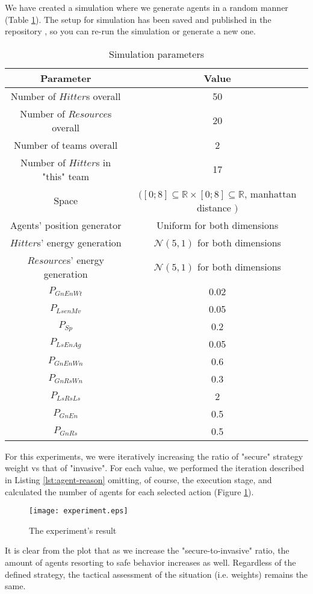 We have created a simulation where we generate agents in a random manner (Table \ref{tab:sim-parameters}). The setup for
simulation has been saved and published in the repository \cite{github}, so you can re-run the simulation or generate a
new one.

\begin{table}[h!]
    \centering
    \caption{Simulation parameters}
    \label{tab:sim-parameters}

    \begin{tabular}[hbt!]{c c}
        Parameter & Value\\
        \hline
        Number of $Hitter$s overall & 50 \\
        Number of $Resource$s overall & 20 \\
        Number of teams overall & 2 \\
        Number of $Hitter$s in "this" team & 17 \\
        Space & $([0;8] \subseteq \mathbb{R} \times [0;8] \subseteq \mathbb{R}$, manhattan distance $)$ \\
        Agents' position generator & Uniform for both dimensions \\
        $Hitter$s' energy generation & $\mathcal{N} (5,1)$ for both dimensions\\
        $Resource$s' energy generation & $\mathcal{N} (5,1)$ for both dimensions\\
        $P_{GnEnWt}$ & 0.02\\
        $P_{LsenMv}$ & 0.05\\
        $P_{Sp}$     & 0.2\\
        $P_{LsEnAg}$ & 0.05\\
        $P_{GnEnWn}$ & 0.6\\
        $P_{GnRsWn}$ & 0.3\\
        $P_{LsRsLs}$ & 2\\
        $P_{GnEn}$   & 0.5\\
        $P_{GnRs}$   & 0.5\\
        \hline
    \end{tabular}
\end{table}

For this experiments, we were iteratively increasing the ratio of "secure" strategy weight vs that of "invasive". For
each value, we performed the iteration described in Listing \ref{lst:agent-reason} omitting, of course, the execution
stage, and calculated the number of agents for each selected action (Figure \ref{fig:experiment}).

\begin{figure}[hbt!]
    \centering
    \texttt{[image: experiment.eps]}

    \caption{\small The experiment's result}
    \label{fig:experiment}
\end{figure}

It is clear from the plot that as we increase the "secure-to-invasive" ratio, the amount of agents resorting to safe
behavior increases as well. Regardless of the defined strategy, the tactical assessment of the situation (i.e. weights)
remains the same.

